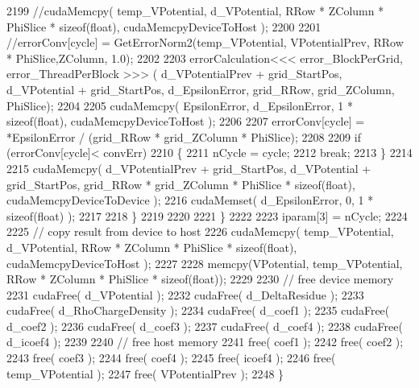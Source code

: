 \begin{DoxyCode}
2199                 \textcolor{comment}{//cudaMemcpy( temp\_VPotential, d\_VPotential, RRow * ZColumn * PhiSlice * sizeof(float),
       cudaMemcpyDeviceToHost );}
2200     
2201                 \textcolor{comment}{//errorConv[cycle] = GetErrorNorm2(temp\_VPotential, VPotentialPrev, RRow *
       PhiSlice,ZColumn, 1.0); }
2202 
2203                 errorCalculation<<< error\_BlockPerGrid, error\_ThreadPerBlock >>> ( d\_VPotentialPrev + 
      grid\_StartPos, d\_VPotential + grid\_StartPos, d\_EpsilonError, grid\_RRow, grid\_ZColumn, PhiSlice);
2204 
2205                 cudaMemcpy( EpsilonError, d\_EpsilonError, 1 * \textcolor{keyword}{sizeof}(\textcolor{keywordtype}{float}), cudaMemcpyDeviceToHost );      
2206                 
2207                 errorConv[cycle] = *EpsilonError  / (grid\_RRow * grid\_ZColumn * PhiSlice);
2208 
2209                 \textcolor{keywordflow}{if} (errorConv[cycle]< convErr)
2210                 \{
2211                     nCycle = cycle;         
2212                     \textcolor{keywordflow}{break};
2213                 \}
2214 
2215                 cudaMemcpy( d\_VPotentialPrev + grid\_StartPos, d\_VPotential + grid\_StartPos, grid\_RRow * 
      grid\_ZColumn * PhiSlice * \textcolor{keyword}{sizeof}(\textcolor{keywordtype}{float}), cudaMemcpyDeviceToDevice );
2216                 cudaMemset( d\_EpsilonError, 0, 1 * \textcolor{keyword}{sizeof}(\textcolor{keywordtype}{float}) );
2217                 
2218         \}
2219         
2220         
2221     \}
2222 
2223     iparam[3] = nCycle; 
2224 
2225     \textcolor{comment}{// copy result from device to host}
2226     cudaMemcpy( temp\_VPotential, d\_VPotential, RRow * ZColumn * PhiSlice * \textcolor{keyword}{sizeof}(\textcolor{keywordtype}{float}), 
      cudaMemcpyDeviceToHost );
2227 
2228     memcpy(VPotential, temp\_VPotential, RRow * ZColumn * PhiSlice * \textcolor{keyword}{sizeof}(\textcolor{keywordtype}{float}));
2229 
2230     \textcolor{comment}{// free device memory}
2231     cudaFree( d\_VPotential );
2232     cudaFree( d\_DeltaResidue );
2233     cudaFree( d\_RhoChargeDensity );
2234     cudaFree( d\_coef1 );
2235     cudaFree( d\_coef2 );
2236     cudaFree( d\_coef3 );
2237     cudaFree( d\_coef4 );
2238     cudaFree( d\_icoef4 );
2239 
2240     \textcolor{comment}{// free host memory}
2241     free( coef1 );
2242     free( coef2 );
2243     free( coef3 );
2244     free( coef4 );
2245     free( icoef4 );
2246     free( temp\_VPotential );
2247     free( VPotentialPrev );
2248 \}
\end{DoxyCode}
\hypertarget{PoissonSolver3DGPU_8cu_a29ff8c657a945ecbeeb7b219169d09c6}{}\label{PoissonSolver3DGPU_8cu_a29ff8c657a945ecbeeb7b219169d09c6} 
